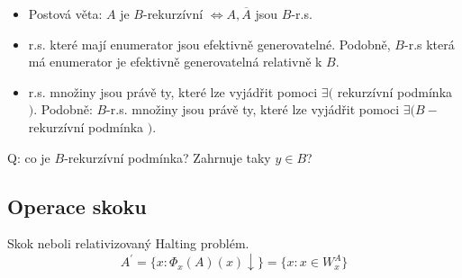 \begin{properties}\label{rel_prop}
\begin{itemize}
	\item Postová věta:
		$A$ je $B$-rekurzívní $\iff A, \overline{A}$ jsou $B$-r.s.
	\item r.s. které mají enumerator jsou efektivně generovatelné.
		Podobně, $B$-r.s která má enumerator je efektivně generovatelná relativně k $B$.
	\item r.s. množiny jsou právě ty, které lze vyjádřit pomoci $\exists ($ rekurzívní podmínka $)$.
		Podobně: $B$-r.s. množiny jsou právě ty, které lze vyjádřit pomoci $\exists (B-$rekurzívní podmínka $)$.
\end{itemize}
\end{properties}

Q: co je $B$-rekurzívní podmínka? Zahrnuje taky $y \in B$?

\subsection{Operace skoku}

\begin{definition}[Jump]\label{jump}
	Skok neboli relativizovaný Halting problém.
	\[ A^{\prime} = \{ x: \Phi_x(A)(x) \downarrow \} = \{ x: x \in W_x^A \} \]
\end{definition}

